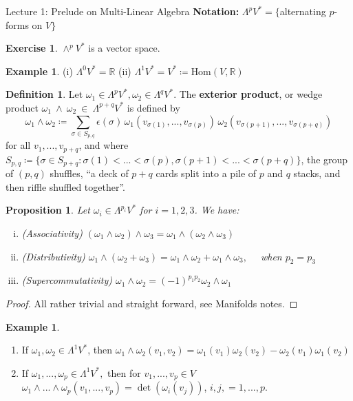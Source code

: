 \documentclass[10pt]{article}
\theoremstyle{plain}
\newtheorem{prop}[thm]{Proposition}
\theoremstyle{definition}
\newtheorem{defn}[thm]{Definition} %
\newtheorem{exmp}[thm]{Example} %
\newtheorem{exercise}[thm]{Exercise}
\newcommand{\Notation}{\textbf{Notation: }}
\newcommand{\Real}{\mathbb{R}}
\newcommand{\setform}[2]{\Lambda^{#1} {#2}}
\newcommand{\Hom}[2]{\text{Hom}\left(#1,#2\right)}
\newcommand{\allthevs}[2]{v_{#1},...,v_{#2}}
\newcommand{\wedgge}{\omega_1\wedge\omega_2}
\begin{document}
\begin{section}{Lecture 1: Prelude on Multi-Linear Algebra}
\noindent
\Notation $\Lambda^p V^* = \{$alternating $p$-forms on $V\}$
\begin{exercise}
$\wedge^p V^*$ is a vector space.
\end{exercise}
\begin{exmp}
 (i) $\Lambda^0 V^* = \Real$ \quad (ii) $\Lambda^1V^* = V^* \coloneqq \Hom{V}{\Real}$
\end{exmp}
\begin{defn}
Let $\omega_1 \in \setform{p}{V^*}, \omega_2 \in \setform{q}{V^*}$. The \textbf{exterior product}, or wedge product $\omega_1~\wedge~\omega_2~\in~\setform{p+q}{V^*}$ is defined by
$$\omega_1\wedge\omega_2 \coloneqq \sum\limits_{\sigma \in S_{p,q}}\epsilon(\sigma)\, \omega_1(\allthevs{\sigma(1)}{\sigma(p)})\,\omega_2(\allthevs{\sigma(p+1)}{\sigma(p+q)})$$
for all $\allthevs{1}{p+q}$, and where $ S_{p,q} \coloneqq \{ \sigma \in S_{p+q} : \sigma(1)<...<\sigma(p),\sigma(p+1)<...<\sigma(p+q)\} $, the group of $(p,q)$ shuffles,  ``a deck of $p+q$ cards split into a pile of $p$ and $q$ stacks, and then riffle shuffled together''.
\end{defn}
\begin{prop}
Let $\omega_i \in \setform{p_i}{V^*}$ for $i = 1,2,3$. We have:
\begin{enumerate}[(i)]
    \item (Associativity) $(\omega_1\wedge\omega_2)\wedge\omega_3 =\omega_1\wedge(\omega_2\wedge\omega_3 ) $
    \item (Distributivity) $\omega_1\wedge(\omega_2+ \omega_3) = \omega_1\wedge\omega_2 + \omega_1\wedge\omega_3,\quad$ when $p_2 = p_3$
    \item (Supercommutativity) $\omega_1\wedge\omega_2 = (-1)^{p_1 p_2}\omega_2\wedge\omega_1$ 
\end{enumerate}
\end{prop}
\begin{proof}
All rather trivial and straight forward, see Manifolds notes.
\end{proof}
\begin{exmp}\noindent
\begin{enumerate}[($i$)]
    \item If $\omega_1,\omega_2 \in \setform{1}{V^*}$, then $\wedgge(v_1,v_2) =\omega_1(v_1)\omega_2(v_2) - \omega_2(v_1)\omega_1(v_2)$
    \item If $\omega_1,...,\omega_p \in \setform{1}{V^*},$ then for $\allthevs{1}{p}\in V$ $\omega_1\wedge...\wedge\omega_p(\allthevs{1}{p}) = \det(\omega_i(v_j))$, $i,j, = 1,...,p$.
\end{enumerate}

\end{exmp}
\end{section}
\end{document}
